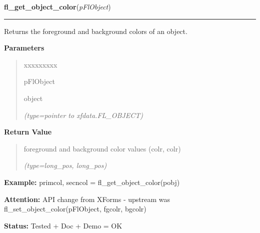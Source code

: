     \vspace{0.5ex}

\hspace{.8\funcindent}\begin{boxedminipage}{\funcwidth}

    \raggedright \textbf{fl\_get\_object\_color}(\textit{pFlObject})

    \vspace{-1.5ex}

    \rule{\textwidth}{0.5\fboxrule}
\setlength{\parskip}{2ex}
    Returns the foreground and background colors of an object.

\setlength{\parskip}{1ex}
      \textbf{Parameters}
      \vspace{-1ex}

      \begin{quote}
        \begin{Ventry}{xxxxxxxxx}

          \item[pFlObject]

          object

            {\it (type=pointer to xfdata.FL\_OBJECT)}

        \end{Ventry}

      \end{quote}

      \textbf{Return Value}
    \vspace{-1ex}

      \begin{quote}
      foreground and background color values (colr, colr)

      {\it (type=long\_pos, long\_pos)}

      \end{quote}

\textbf{Example:} primcol, secncol = fl\_get\_object\_color(pobj)



\textbf{Attention:} API change from XForms - upstream was fl\_set\_object\_color(pFlObject, 
fgcolr, bgcolr)



\textbf{Status:} Tested + Doc + Demo = OK



    \end{boxedminipage}

    \label{xformslib:flbasic:fl_set_object_label}

